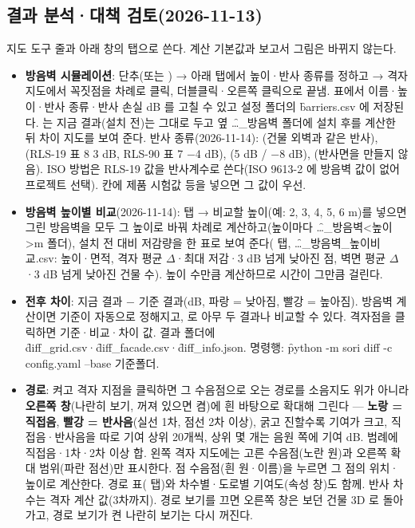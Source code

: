 \documentclass[10.5pt,a4paper]{article}
\begin{document}
\subsection{결과 분석·대책 검토(2026-11-13)}\label{sec:analysis}
지도 도구 줄과 아래  창의 탭으로 쓴다. 계산 기본값과 보고서 그림은 바뀌지 않는다.
\begin{itemize}
\item \textbf{방음벽 시뮬레이션}:  단추(또는 \menu{}) → 아래  탭에서 높이·반사 종류를 정하고  → 격자 지도에서 꼭짓점을 차례로 클릭, 더블클릭·오른쪽 클릭으로 끝냄. 표에서 이름·높이·반사 종류·반사 손실 dB 를 고칠 수 있고 설정 폴더의 \f{barriers.csv} 에 저장된다. 는 지금 결과(설치 전)는 그대로 두고 옆 \f{…\_방음벽} 폴더에 설치 후를 계산한 뒤 차이 지도를 보여 준다. 반사 종류(2026-11-14): (건물 외벽과 같은 반사), (RLS-19 표 8 3 dB, RLS-90 표 7 −4 dB), (5 dB / −8 dB), (반사면을 만들지 않음). ISO 방법은 RLS-19 값을 반사계수로 쓴다(ISO 9613-2 에 방음벽 값이 없어 프로젝트 선택).  칸에 제품 시험값 등을 넣으면 그 값이 우선.
\item \textbf{방음벽 높이별 비교}(2026-11-14):  탭  → 비교할 높이(예: 2, 3, 4, 5, 6 m)를 넣으면 그린 방음벽을 모두 그 높이로 바꿔 차례로 계산하고(높이마다 \f{…\_방음벽<높이>m} 폴더), 설치 전 대비 저감량을 한 표로 보여 준다( 탭, \f{…\_방음벽\_높이비교.csv}: 높이·면적, 격자 평균 $\Delta$·최대 저감·3 dB 넘게 낮아진 점, 벽면 평균 $\Delta$·3 dB 넘게 낮아진 건물 수). 높이 수만큼 계산하므로 시간이 그만큼 걸린다.
\item \textbf{전후 차이}: 지금 결과 − 기준 결과(dB, 파랑 = 낮아짐, 빨강 = 높아짐). 방음벽 계산이면 기준이 자동으로 정해지고, \menu{}로 아무 두 결과나 비교할 수 있다. 격자점을 클릭하면 기준·비교·차이 값. 결과 폴더에 \f{diff\_grid.csv}·\f{diff\_facade.csv}·\f{diff\_info.json}. 명령행: \f{python -m sori diff -c config.yaml --base 기준폴더}.
\item \textbf{경로}: 켜고 격자 지점을 클릭하면 그 수음점으로 오는 경로를 소음지도 위가 아니라 \textbf{오른쪽 창}(나란히 보기, 꺼져 있으면 켬)에 흰 바탕으로 확대해 그린다 — \textbf{노랑 = 직접음}, \textbf{빨강 = 반사음}(실선 1차, 점선 2차 이상), 굵고 진할수록 기여가 크고, 직접음·반사음을 따로 기여 상위 20개씩, 상위 몇 개는 음원 쪽에 기여 dB. 범례에 직접음·1차·2차 이상 합. 왼쪽 격자 지도에는 고른 수음점(노란 원)과 오른쪽 확대 범위(파란 점선)만 표시한다. 점 수음점(흰 원·이름)을 누르면 그 점의 위치·높이로 계산한다. 경로 표( 탭)와 차수별·도로별 기여도(속성 창)도 함께. 반사 차수는 격자 계산 값(3차까지). 경로 보기를 끄면 오른쪽 창은 보던 건물 3D 로 돌아가고, 경로 보기가 켠 나란히 보기는 다시 꺼진다.

\end{itemize}
\end{document}
